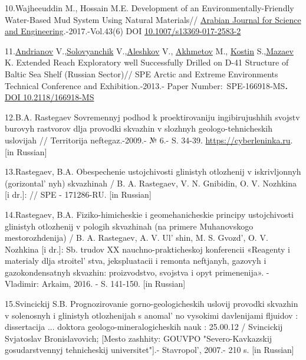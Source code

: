 \begin{references}
10.Wajheeuddin M., Hossain M.E. Development of an
Environmentally-Friendly Water-Based Mud System Using Natural
Materials//
\href{https://www.researchgate.net/journal/Arabian-Journal-for-Science-and-Engineering-2191-4281?_tp=eyJjb250ZXh0Ijp7ImZpcnN0UGFnZSI6InB1YmxpY2F0aW9uIiwicGFnZSI6InB1YmxpY2F0aW9uIn19}{Arabian
Journal for Science and Engineering}.-2017.-Vol.43(6) \linebreak DOI
\href{https://doi.org/10.1007/s13369-017-2583-2}{10.1007/s13369-017-2583-2}

11.\href{javascript:;}{Andrianov} V.,\href{javascript:;}{Solovyanchik}
V.,\href{javascript:;}{Aleshkov} V., \href{javascript:;}{Akhmetov} M.,
\href{javascript:;}{Kostin} S.,\href{javascript:;}{Mazaev} K. Extended
Reach Exploratory well Successfully Drilled on D-41 Structure of Baltic
Sea Shelf (Russian Sector)// SPE Arctic and Extreme Environments
Technical Conference and Exhibition.-2013.- Paper
Number:~SPE-166918-MS{\bfseries .}
\href{https://doi.org/10.2118/166918-MS}{DOI 10.2118/166918-MS}

12.B.A. Rastegaev Sovremennyj podhod k proektirovaniju ingibirujushhih
svojstv burovyh rastvorov dlja provodki skvazhin v slozhnyh
geologo-tehnicheskih uslovijah // Territorija neftegaz.-2009.- № 6.- S.
34-39.
\href{https://cyberleninka.ru/article/n/sovremennyy-podhod-k-proektirovaniyu-ingibiruyuschih-svoystv-burovyh-rastvorov-dlya-provodki-skvazhin-v-slozhnyh-geologo-tehnicheskih}{https://cyberleninka.ru}.
{[}in Russian{]}

13.Rastegaev, B.A. Obespechenie ustojchivosti glinistyh otlozhenij v
iskrivljonnyh (gorizontal' nyh) \linebreak skvazhinah / B. A.
Rastegaev, V. N. Gnibidin, O. V. Nozhkina {[}i dr.{]}: // SPE -
171286-RU. {[}in Russian{]}

14.Rastegaev, B.A. Fiziko-himicheskie i geomehanicheskie principy
ustojchivosti glinistyh otlozhenij v pologih skvazhinah (na primere
Muhanovskogo mestorozhdenija) / B. A. Rastegaev, A. V.
Ul' shin, M. S. Gvozd', O. V. Nozhkina
{[}i dr.{]}: Sb. trudov XX nauchno-prakticheskoj konferencii «Reagenty i
materialy dlja stroitel' stva, jekspluatacii i remonta
neftjanyh, gazovyh i gazokondensatnyh skvazhin: proizvodstvo, svojstva i
opyt primenenija». - Vladimir: Arkaim, 2016. - S. 141-150. {[}in
Russian{]}

15.Svincickij S.B. Prognozirovanie gorno-geologicheskih uslovij provodki
skvazhin v solenosnyh i glinistyh otlozhenijah s
anomal' no vysokimi davlenijami fljuidov : dissertacija
... doktora geologo-mineralogicheskih nauk : 25.00.12 / Svincickij
Svjatoslav Bronislavovich; {[}Mesto zashhity: GOUVPO "Severo-Kavkazskij
gosudarstvennyj tehnicheskij universitet"{]}.-
Stavropol', 2007.- 210 s. {[}in Russian{]}


\end{references}
